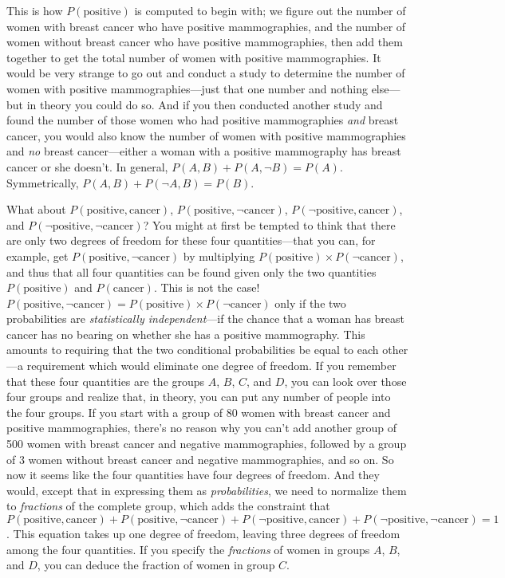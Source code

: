 {
 This is how $P(\text{positive})$ is computed to begin with; we figure out
the number of women with breast cancer who have positive mammographies,
and the number of women without breast cancer who have positive
mammographies, then add them together to get the total number of women
with positive mammographies. It would be very strange to go out and
conduct a study to determine the number of women with positive
mammographies---just that one number and nothing else---but in theory
you could do so. And if you then conducted another study and found the
number of those women who had positive mammographies \textit{and}
breast cancer, you would also know the number of women with positive
mammographies and \textit{no} breast cancer---either a woman with a
positive mammography has breast cancer or she doesn't.
In general, $P(A,B) + P(A,\lnot B) = P(A)$. Symmetrically, $P(A,B) +
P(\lnot A,B) = P(B)$.}

{
 What about $P(\text{positive}, \text{cancer})$, $P(\text{positive},\lnot\text{cancer})$,
$P(\lnot\text{positive}, \text{cancer})$, and
$P(\lnot\text{positive},\lnot\text{cancer})$? You might at first be tempted
to think that there are only two degrees of freedom for these four
quantities---that you can, for example, get
$P(\text{positive},\lnot\text{cancer})$ by multiplying $P(\text{positive}) \times
P(\lnot\text{cancer})$, and thus that all four quantities can be found
given only the two quantities $P(\text{positive})$ and $P(\text{cancer})$. This is not
the case! $P(\text{positive},\lnot\text{cancer}) = P(\text{positive}) \times
P(\lnot\text{cancer})$ only if the two probabilities are
\textit{statistically independent}{}---if the chance that a woman has
breast cancer has no bearing on whether she has a positive mammography.
This amounts to requiring that the two conditional probabilities be
equal to each other---a requirement which would eliminate one degree of
freedom. If you remember that these four quantities are the groups $A$,
$B$, $C$, and $D$, you can look over those four groups and realize that, in
theory, you can put any number of people into the four groups. If you
start with a group of 80 women with breast cancer and positive
mammographies, there's no reason why you
can't add another group of 500 women with breast cancer
and negative mammographies, followed by a group of 3 women without
breast cancer and negative mammographies, and so on. So now it seems
like the four quantities have four degrees of freedom. And they would,
except that in expressing them as \textit{probabilities}, we need to
normalize them to \textit{fractions} of the complete group, which adds
the constraint that $P(\text{positive},
\text{cancer})+P(\text{positive},\lnot\text{cancer})+P(\lnot\text{positive},
\text{cancer})+P(\lnot\text{positive},\lnot\text{cancer}) = 1$. This equation
takes up one degree of freedom, leaving three degrees of freedom among
the four quantities. If you specify the \textit{fractions} of women in
groups $A$, $B$, and $D$, you can deduce the fraction of women in group $C$.}

